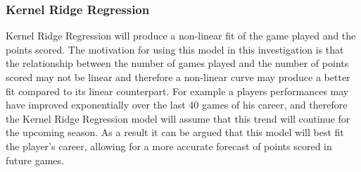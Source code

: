 \documentclass[a4paper,11pt,twoside]{article}
\begin{document}
\subsubsection{Kernel Ridge Regression}

Kernel Ridge Regression will produce a non-linear fit of the game played and the points scored. The motivation for using this model in this investigation is that the relationship between the number of games played and the number of points scored may not be linear and therefore a non-linear curve may produce a better fit compared to its linear counterpart. For example a players performances may have improved exponentially over the last 40 games of his career, and therefore the Kernel Ridge Regression model will assume that this trend will continue for the upcoming season. As a result it can be argued that this model will best fit the player's career, allowing for a more accurate forecast of points scored in future games.
\end{document}
